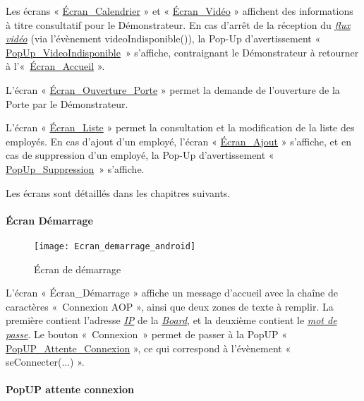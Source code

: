 Les écrans « \hyperlink{EcranCalendrier}{Écran\_Calendrier} » et « \hyperlink{EcranVideo}{Écran\_Vidéo} » affichent des informations à titre consultatif pour le Démonstrateur.
En cas d'arrêt de la réception du \hyperlink{video}{\textit{flux vidéo}} (via l'évènement videoIndisponible()), la Pop-Up d’avertissement « \hyperlink{popUpVideoIndisponible}{PopUp\_VideoIndisponible}~» s'affiche, contraignant le Démonstrateur à retourner à l'«~\hyperlink{EcranAccueil}{Écran\_Accueil} ».

L’écran « \hyperlink{EcranPorte}{Écran\_Ouverture\_Porte} » permet la demande de l’ouverture de la Porte par le Démonstrateur. 

L’écran « \hyperlink{EcranListe}{Écran\_Liste} » permet la consultation et la modification de la liste des employés. 
En cas d’ajout d’un employé, l’écran « \hyperlink{EcranAjoutStandard}{Écran\_Ajout} » s’affiche, et en cas de suppression d’un employé, la Pop-Up d’avertissement « \hyperlink{popUpSuppression}{PopUp\_Suppression}~» s’affiche. 

Les écrans sont détaillés dans les chapitres suivants.

\newpage

\paragraph{Écran Démarrage}
\hypertarget{EcranDemarrage}{}

\begin{figure} [H]
    \centering
    \texttt{[image: Ecran\_demarrage\_android]}
    \caption{Écran de démarrage}
    \label{Écran Démarrage}
\end{figure}

L’écran « Écran\_Démarrage » affiche un message d’accueil avec la chaîne de caractères «~Connexion AOP », ainsi que deux zones de texte à remplir.
La première contient l’adresse \hyperlink{IP}{{\textit{IP}}} de la \hyperlink{bd}{{\textit{Board}}}, et la deuxième contient le \hyperlink{mdp}{{\textit{mot de passe}}}. 
Le bouton «~Connexion~» permet de passer à la PopUP « \hyperlink{popUpAttenteConnexion}{PopUP\_Attente\_Connexion} », ce qui correspond à l'évènement « seConnecter(...) ».

\newpage

\paragraph{PopUP attente connexion}
\hypertarget{popUpAttenteConnexion}{}

